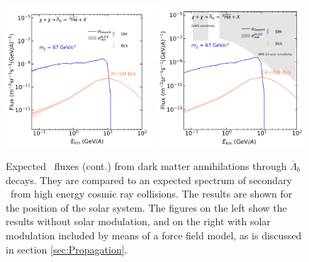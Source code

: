 \begin{figure}\ContinuedFloat
    \centering
    \includegraphics[width=0.49\textwidth]{figures/he3bar_LambdaB_LIS_fine.png}
    \includegraphics[width=0.49\textwidth]{figures/he3bar_LambdaB_TOA_fine.png}
    \caption{Expected \ahe\ fluxes (cont.) from dark matter annihilations through $\overline{\Lambda}_b$ decays. They are compared to an expected spectrum of secondary \ahe\ from high energy cosmic ray collisions. The results are shown for the position of the solar system. The figures on the left show the results without solar modulation, and on the right with solar modulation included by means of a force field model, as is discussed in section \ref{sec:Propagation}.}
    \label{fig:Results_He3_fluxes_diff_DM_masses}
\end{figure}


